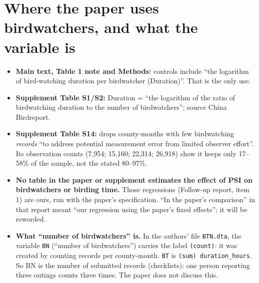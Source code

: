 \documentclass[11pt]{article}
\begin{document}
\section{Where the paper uses birdwatchers, and what the variable is}
\begin{itemize}[leftmargin=14pt,itemsep=2pt]
\item \textbf{Main text, Table 1 note and Methods:} controls include ``the logarithm of bird-watching duration per birdwatcher (Duration)''. That is the only use.
\item \textbf{Supplement Table S1/S2:} Duration = ``the logarithm of the ratio of birdwatching duration to the number of birdwatchers''; source China Birdreport.
\item \textbf{Supplement Table S14:} drops county-months with few birdwatching \emph{records} ``to address potential measurement error from limited observer effort''. Its observation counts (7,954; 15,160; 22,314; 26,918) show it keeps only 17--58\% of the sample, not the stated 80--97\%.
\item \textbf{No table in the paper or supplement estimates the effect of PSI on birdwatchers or birding time.} Those regressions (Follow-up report, item 1) are ours, run with the paper's specification. ``In the paper's comparison'' in that report meant ``our regression using the paper's fixed effects''; it will be reworded.
\item \textbf{What ``number of birdwatchers'' is.} In the authors' file \texttt{BTN.dta}, the variable \texttt{BN} (``number of birdwatchers'') carries the label \texttt{(count)}: it was created by counting records per county-month. \texttt{BT} is \texttt{(sum) duration\_hours}. So BN is the number of submitted records (checklists): one person reporting three outings counts three times. The paper does not discuss this.
\end{itemize}

\end{document}
